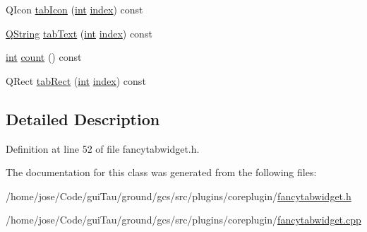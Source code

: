\begin{DoxyCompactItemize}
\item 
Q\-Icon \hyperlink{group___core_plugin_gae277615a992118760cb76176dbfa2e81}{tab\-Icon} (\hyperlink{ioapi_8h_a787fa3cf048117ba7123753c1e74fcd6}{int} \hyperlink{glext_8h_ab47dd9958bcadea08866b42bf358e95e}{index}) const 
\item 
\hyperlink{group___u_a_v_objects_plugin_gab9d252f49c333c94a72f97ce3105a32d}{Q\-String} \hyperlink{group___core_plugin_ga3dbe2e5ffcd731a16768adc3fd471191}{tab\-Text} (\hyperlink{ioapi_8h_a787fa3cf048117ba7123753c1e74fcd6}{int} \hyperlink{glext_8h_ab47dd9958bcadea08866b42bf358e95e}{index}) const 
\item 
\hyperlink{ioapi_8h_a787fa3cf048117ba7123753c1e74fcd6}{int} \hyperlink{group___core_plugin_gafef795e24cd663b07318620524a957da}{count} () const 
\item 
Q\-Rect \hyperlink{group___core_plugin_ga73860a10ee1c7ab8ecc257d227287058}{tab\-Rect} (\hyperlink{ioapi_8h_a787fa3cf048117ba7123753c1e74fcd6}{int} \hyperlink{glext_8h_ab47dd9958bcadea08866b42bf358e95e}{index}) const 
\end{DoxyCompactItemize}


\subsection{Detailed Description}


Definition at line 52 of file fancytabwidget.\-h.



The documentation for this class was generated from the following files\-:\begin{DoxyCompactItemize}
\item 
/home/jose/\-Code/gui\-Tau/ground/gcs/src/plugins/coreplugin/\hyperlink{coreplugin_2fancytabwidget_8h}{fancytabwidget.\-h}\item 
/home/jose/\-Code/gui\-Tau/ground/gcs/src/plugins/coreplugin/\hyperlink{coreplugin_2fancytabwidget_8cpp}{fancytabwidget.\-cpp}\end{DoxyCompactItemize}
